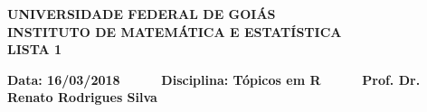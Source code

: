 \documentclass[10pt,a4paper]{article}
\begin{document}


  \begin{center}
     \bf{UNIVERSIDADE FEDERAL DE GOI\'AS  \\ INSTITUTO DE MATEM\'ATICA E ESTAT\'ISTICA \\ LISTA 1}
  \end{center} 

  

  \begin{flushleft}
     {\bf Data: 16/03/2018 $\phantom{11111}$  Disciplina: T\'opicos em R $\phantom{11111}$  Prof. Dr. Renato Rodrigues Silva  }
  \end{flushleft}
\end{document}

